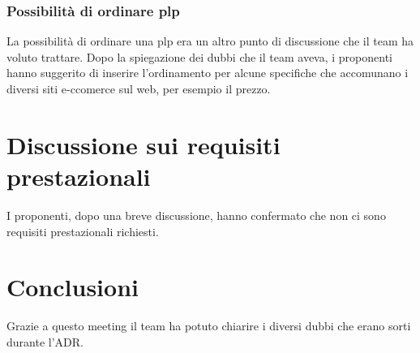 \subsubsection{Possibilità di ordinare plp}
La possibilità di ordinare una plp era un altro punto di discussione che il team ha voluto trattare. Dopo la spiegazione dei dubbi che il team aveva, i proponenti hanno suggerito di inserire l'ordinamento per alcune specifiche che accomunano i diversi siti e-ccomerce sul web, per esempio il prezzo.

\section{Discussione sui requisiti prestazionali}
I proponenti, dopo una breve discussione, hanno confermato che non ci sono requisiti prestazionali richiesti.

\section{Conclusioni}
Grazie a questo meeting il team ha potuto chiarire i diversi dubbi che erano sorti durante l'ADR.